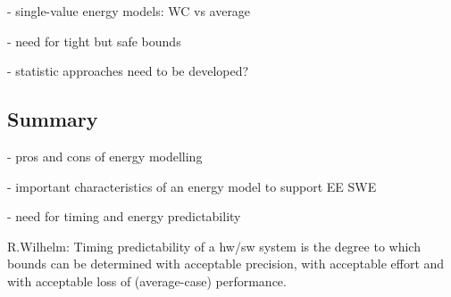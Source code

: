 - single-value energy models: WC vs average

- need for tight but safe bounds

- statistic approaches need to be developed?

\subsection{Summary}

- pros and cons of energy modelling

- important characteristics of an energy model to support EE SWE

- need for timing and energy predictability

R.Wilhelm: Timing predictability of a hw/sw system is the degree to which bounds can be determined with acceptable precision, with acceptable effort and with acceptable loss of (average-case) performance. 
